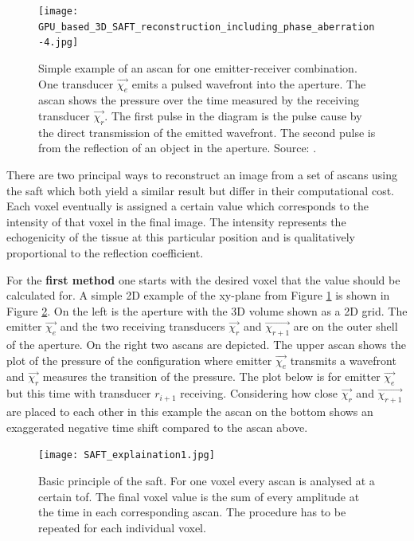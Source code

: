 \begin{figure}[H]
    \centering
    \texttt{[image: GPU\_based\_3D\_SAFT\_reconstruction\_including\_phase\_aberration-4.jpg]}
    \caption{ Simple example of an \ac{ascan} for one emitter-receiver combination. One transducer $\overrightarrow{\chi_e}$ emits a pulsed wavefront into the aperture. The \ac{ascan} shows the pressure over the time measured by the receiving transducer $\overrightarrow{\chi_r}$. The first pulse in the diagram is the pulse cause by the direct transmission of the emitted wavefront. The second pulse is from the reflection of an object in the aperture. Source: \cite{Kretzek2014GPUAberration}. }
    \label{ascan_example}
\end{figure}

There are two principal ways to reconstruct an image from a set of \acp{ascan} using the \ac{saft} which both yield a similar result but differ in their computational cost. Each voxel eventually is assigned a certain value which corresponds to the intensity of that voxel in the final image. The intensity represents the echogenicity of the tissue at this particular position and is qualitatively proportional to the reflection coefficient.

\bigskip

For the \textbf{first method} one starts with the desired voxel that the value should be calculated for.
A simple 2D example of the xy-plane from Figure \ref{ascan_example} is shown in Figure \ref{SAFT_explain1}. On the left is the aperture with the 3D volume shown as a 2D grid. The emitter $\overrightarrow{{\chi_e }}$ and the two receiving transducers $\overrightarrow{{\chi_r }}$ and $\overrightarrow{{\chi_{r+1} }}$ are on the outer shell of the aperture. On the right two \acp{ascan} are depicted. The upper \ac{ascan} shows the plot of the pressure of the configuration where emitter $\overrightarrow{{\chi_e }}$ transmits a wavefront and $\overrightarrow{{\chi_r }}$ measures the transition of the pressure. The plot below is for emitter $\overrightarrow{{\chi_e }}$ but this time with transducer $r_{i+1}$ receiving. Considering how close $\overrightarrow{{\chi_r }}$ and $\overrightarrow{{\chi_{r+1} }}$ are placed to each other in this example the \ac{ascan} on the bottom shows an exaggerated negative time shift compared to the \ac{ascan} above.

\begin{figure}[H]
    \centering
    \texttt{[image: SAFT\_explaination1.jpg]}
    \caption{Basic principle of the \ac{saft}. For one voxel every \ac{ascan} is analysed at a certain \ac{tof}. The final voxel value is the sum of every amplitude at the time in each corresponding \ac{ascan}. The procedure has to be repeated for each individual voxel. }
    \label{SAFT_explain1}
\end{figure}


